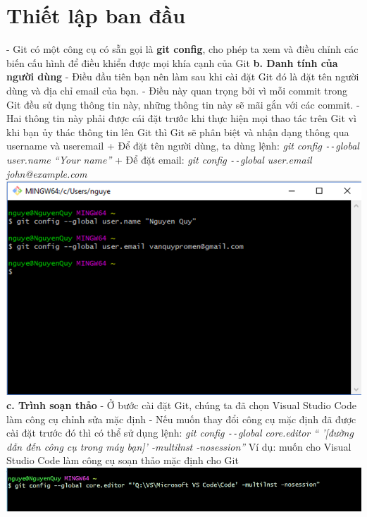 \documentclass[12pt,a4paper]{report}
\begin{document}
\section{Thiết lập ban đầu} 
\hspace{0.6cm}{\bf a. Git folder structure ( Cấu trúc thư mục Git)}\vskip 0.4cm
- Git có một công cụ có sẵn gọi là \textbf{git config}, cho phép ta xem và điều chỉnh các biến cấu hình để điều khiển được mọi khía cạnh của Git \vskip 0.4cm
{\bf b. Danh tính của người dùng}\vskip 0.4cm
- Điều đầu tiên bạn nên làm sau khi cài đặt Git đó là đặt tên người dùng và địa chỉ email của bạn.\vskip 0.4cm
- Điều này quan trọng bởi vì mỗi commit trong Git đều sử dụng thông tin này, những thông tin này sẽ mãi gắn với các commit.\vskip 0.4cm
- Hai thông tin này phải được cái đặt trước khi thực hiện mọi thao tác trên Git vì khi bạn ủy thác thông tin lên Git thì Git sẽ phân biệt và nhận dạng thông qua username và useremail\vskip 0.4cm
+ Để đặt tên người dùng, ta dùng lệnh: {\it  git config \texttt{-{}-}global user.name “Your name”} \vskip 0.4cm
+ Để đặt email: {\it git config \texttt{-{}-}global user.email john@example.com}\vskip 0.4cm
	\includegraphics[width=0.8\linewidth]{screenshot001}
	\label{fig:screenshot001}
\vskip 0.4cm
\vskip 0.4cm
{\bf c. Trình soạn thảo}\vskip 0.4cm
- Ở bước cài đặt Git, chúng ta đã chọn Visual Studio Code làm công cụ chỉnh sửa mặc định\vskip 0.4cm
- Nếu muốn thay đổi công cụ mặc định đã được cài đặt trước đó thì có thể sử dụng lệnh:\vskip 0.4cm
{\it git config \texttt{-{}-}global core.editor “ ’[đường dẫn đến công cụ trong máy bạn]’ -multilnst -nosession”}\vskip 0.4cm
Ví dụ: muốn cho Visual Studio Code làm công cụ soạn thảo mặc định cho Git\vskip 0.4cm
\vskip 0.4cm
	\includegraphics[width=0.8\linewidth]{screenshot002}
\end{document}
